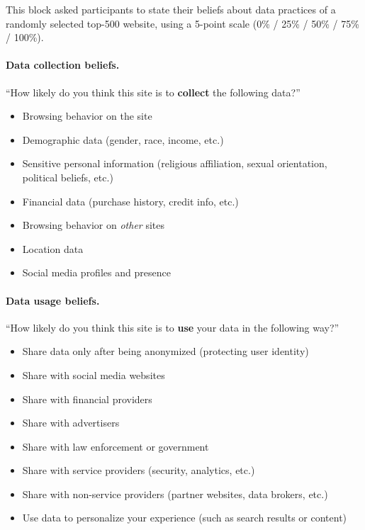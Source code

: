 \documentclass[12pt]{article}
\theoremstyle{definition}
\theoremstyle{remark}
\begin{document}
\begin{appendix}
This block asked participants to state their beliefs about data practices of a randomly selected top-500 website, using a 5-point scale (0\% / 25\% / 50\% / 75\% / 100\%).

\paragraph{Data collection beliefs.} ``How likely do you think this site is to \textbf{collect} the following data?''
\begin{itemize}[leftmargin=2em,itemsep=1pt]
    \item Browsing behavior on the site
    \item Demographic data (gender, race, income, etc.)
    \item Sensitive personal information (religious affiliation, sexual orientation, political beliefs, etc.)
    \item Financial data (purchase history, credit info, etc.)
    \item Browsing behavior on \emph{other} sites
    \item Location data
    \item Social media profiles and presence
\end{itemize}

\paragraph{Data usage beliefs.} ``How likely do you think this site is to \textbf{use} your data in the following way?''
\begin{itemize}[leftmargin=2em,itemsep=1pt]
    \item Share data only after being anonymized (protecting user identity)
    \item Share with social media websites
    \item Share with financial providers
    \item Share with advertisers
    \item Share with law enforcement or government
    \item Share with service providers (security, analytics, etc.)
    \item Share with non-service providers (partner websites, data brokers, etc.)
    \item Use data to personalize your experience (such as search results or content)
\end{itemize}


\end{appendix}
\end{document}

